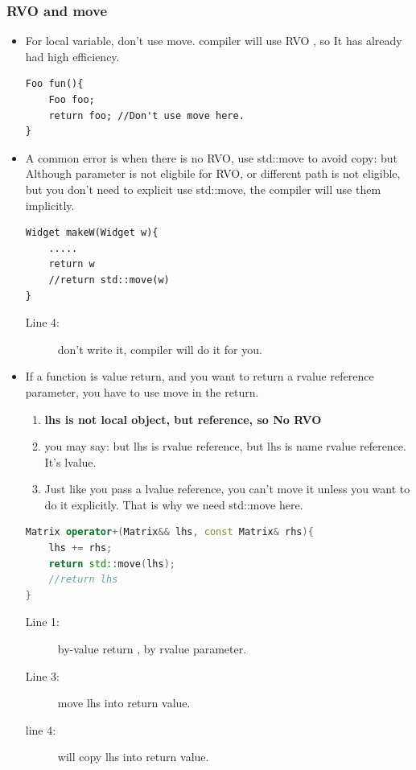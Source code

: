 \documentclass[a4paper,11pt,twoside]{book}
\begin{document}
\subsubsection{RVO and move}
\begin{itemize}
	\item For local variable, don't use move. compiler will use RVO , so It has already had high efficiency.
	
\begin{lstlisting}[numbers=none]
Foo fun(){
	Foo foo;
	return foo; //Don't use move here.
}
\end{lstlisting}
	
	\item A common error is when there is no RVO, use std::move to avoid copy: but Although parameter is not eligbile for RVO, or different path is not eligible, but you don't need to explicit use std::move, the compiler will use them implicitly.
	
\begin{lstlisting}
Widget makeW(Widget w){
	.....
	return w
	//return std::move(w) 
} 
\end{lstlisting}
\begin{description}
	\item[Line 4:] don't write it, compiler will do it for you.
\end{description}
	
	\item If a function is value return, and you want to return a rvalue reference parameter, you have to use move in the return.
	\begin{enumerate}
		\item \textbf{lhs is not local object, but reference, so No RVO}
		\item you may say: but lhs is rvalue reference, but lhs is name rvalue reference. It's lvalue.
		
		\item Just like you pass a lvalue reference, you can't move it unless you want to do it explicitly. That is why we need std::move here.
	\end{enumerate}
\begin{lstlisting}[frame=single, language=c++]
Matrix operator+(Matrix&& lhs, const Matrix& rhs){
	lhs += rhs;
	return std::move(lhs); 
	//return lhs 
} 
\end{lstlisting}
\begin{description}
	\item[Line 1:] by-value return , by rvalue parameter.
	\item[Line 3:] move lhs into return value.
	\item[line 4:] will copy lhs into return value.
\end{description}


\end{itemize}
\end{document}
